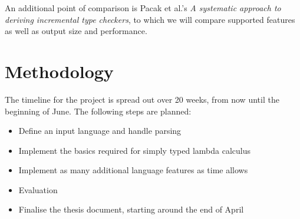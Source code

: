 \documentclass{article}
\begin{document}
An additional point of comparison is Pacak et al.'s \emph{A systematic approach to deriving incremental type checkers}, to which we will compare supported features as well as output size and performance.

\section{Methodology}

The timeline for the project is spread out over 20 weeks, from now until the beginning of June.
The following steps are planned:
\begin{itemize}
  \item Define an input language and handle parsing
  \item Implement the basics required for simply typed lambda calculus
  \item Implement as many additional language features as time allows
  \item Evaluation
  \item Finalise the thesis document, starting around the end of April %
\end{itemize}
\end{document}
